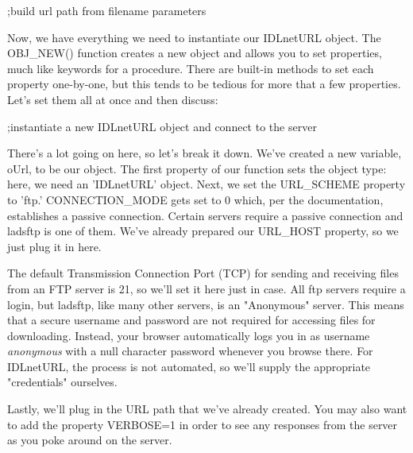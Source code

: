 \documentclass{book}
\newcommand{\codefill}{\centering$\longrightarrow$\hfill{\color{gray}\rule[0.1\baselineskip]{0.5\linewidth}{2pt}}\hfill$\longleftarrow$}
\newcounter{highlight}[page]
\newcommand{\tikzhighlightanchor}[1]{\ensuremath{\vcenter{\hbox{\tikz[remember picture, overlay]{\coordinate (#1 highlight \arabic{highlight});}}}}}
\newcommand{\bh}[0]{\stepcounter{highlight}\tikzhighlightanchor{begin}}
\newcommand{\eh}[0]{\tikzhighlightanchor{end}}
\theoremstyle{aside_style}
\begin{document}
\begin{idl}
;build url path from filename parameters
\end{idl}

Now, we have everything we need to instantiate our IDLnetURL object.
The OBJ\_NEW() function creates a new object and allows you to set properties, much like keywords for a procedure.
There are built-in methods to set each property one-by-one, but this tends to be tedious for more that a few properties.
Let's set them all at once and then discuss:

\begin{idl}
;instantiate a new IDLnetURL object and connect to the server
\end{idl}

There's a lot going on here, so let's break it down. We've created a new variable, oUrl, to be our object. 
The first property of our function sets the object type: here, we need an 'IDLnetURL' object.
Next, we set the URL\_SCHEME property to 'ftp.'
CONNECTION\_MODE gets set to 0 which, per the documentation, establishes a passive connection.
Certain servers require a passive connection and ladsftp is one of them.
We've already prepared our URL\_HOST property, so we just plug it in here.

The default Transmission Connection Port (TCP) for sending and receiving files from an FTP server is 21, so we'll set it here just in case.
All ftp servers require a login, but ladsftp, like many other servers, is an "Anonymous" server.
This means that a secure username and password are not required for accessing files for downloading.
Instead, your browser automatically logs you in as username \textit{anonymous} with a null character password whenever you browse there.
For IDLnetURL, the process is not automated, so we'll supply the appropriate "credentials" ourselves.

Lastly, we'll plug in the URL path that we've already created.
You may also want to add the property VERBOSE=1 in order to see any responses from the server as you poke around on the server.
\end{document}
